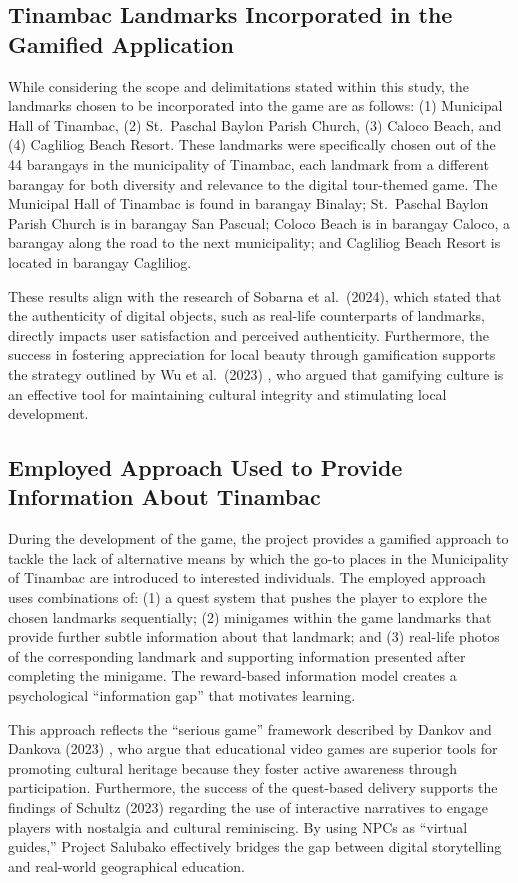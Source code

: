 \documentclass{research}
\begin{document}
\subsection{Tinambac Landmarks Incorporated in the Gamified Application}

While considering the scope and delimitations stated within this study, the landmarks
chosen to be incorporated into the game are as follows: (1) Municipal Hall of Tinambac,
(2) St.\ Paschal Baylon Parish Church, (3) Caloco Beach, and (4) Cagliliog Beach
Resort. These landmarks were specifically chosen out of the 44 barangays in the
municipality of Tinambac, each landmark from a different barangay for both diversity and
relevance to the digital tour-themed game. The Municipal Hall of Tinambac is found in
barangay Binalay; St.\ Paschal Baylon Parish Church is in barangay San Pascual; Coloco
Beach is in barangay Caloco, a barangay along the road to the next municipality; and
Cagliliog Beach Resort is located in barangay Cagliliog.

These results align with the research of Sobarna et al.\ (2024), which stated that the
authenticity of digital objects, such as real-life counterparts of landmarks, directly
impacts user satisfaction and perceived authenticity. Furthermore, the success in
fostering appreciation for local beauty through gamification supports the strategy
outlined by Wu et al.\ (2023) \citep{wu2022}, who argued that gamifying culture is an
effective tool for maintaining cultural integrity and stimulating local development.

\subsection{Employed Approach Used to Provide Information About Tinambac}

During the development of the game, the project provides a gamified approach to tackle
the lack of alternative means by which the go-to places in the Municipality of Tinambac
are introduced to interested individuals. The employed approach uses combinations of:
(1) a quest system that pushes the player to explore the chosen landmarks sequentially;
(2) minigames within the game landmarks that provide further subtle information about
that landmark; and (3) real-life photos of the corresponding landmark and supporting
information presented after completing the minigame. The reward-based information model
creates a psychological ``information gap'' that motivates learning.

This approach reflects the ``serious game'' framework described by Dankov and Dankova
(2023) \citep{dankov2023}, who argue that educational video games are superior tools for
promoting cultural heritage because they foster active awareness through participation.
Furthermore, the success of the quest-based delivery supports the findings of Schultz
(2023) \citep{schultz2023} regarding the use of interactive narratives to engage players
with nostalgia and cultural reminiscing. By using NPCs as ``virtual guides,'' Project
Salubako effectively bridges the gap between digital storytelling and real-world
geographical education.
\end{document}

